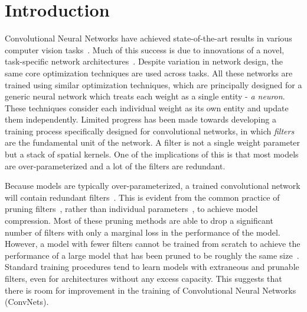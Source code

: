 \section{Introduction}

Convolutional Neural Networks have achieved state-of-the-art results in various computer vision tasks~\cite{he2015deep, Lin2018FocalLF}. 
Much of this success is due to innovations of a novel, task-specific network architectures~\cite{He2017MaskR, Ronneberger2015UNetCN}.
Despite variation in network design, the same core optimization techniques are used across tasks.
All these networks are trained using similar optimization techniques, which are principally designed for a generic neural network which treats each weight as a single entity - \textit{a neuron}.
These techniques consider each individual weight as its own entity and update them independently.
Limited progress has been made towards developing a training process specifically designed for convolutional networks, in which \textit{filters} are the fundamental unit of the network.
A filter is not a single weight parameter but a stack of spatial kernels.
One of the implications of this is that most models are over-parameterized and a lot of the filters are redundant. 

Because models are typically over-parameterized, a trained convolutional network will contain redundant filters~\cite{Cogswell2015ReducingOI, Li2016PruningFF}. 
This is evident from the common practice of pruning filters~\cite{He2017ChannelPF, Anwar2017StructuredPO, Li2016PruningFF, Molchanov2016PruningCN, Liu2017LearningEC, Luo2017ThiNetAF}, rather than individual parameters~\cite{Han2015DeepCC}, to achieve model compression.
Most of these pruning methods are able to drop a significant number of filters with only a marginal loss in the performance of the model.
However, a model with fewer filters cannot be trained from scratch to achieve the performance of a large model that has been pruned to be roughly the same size~\cite{Li2016PruningFF, Luo2017ThiNetAF, Zhu2017ToPO}.
Standard training procedures tend to learn models with extraneous and prunable filters, even for architectures without any excess capacity.
This suggests that there is room for improvement in the training of Convolutional Neural Networks (ConvNets).

